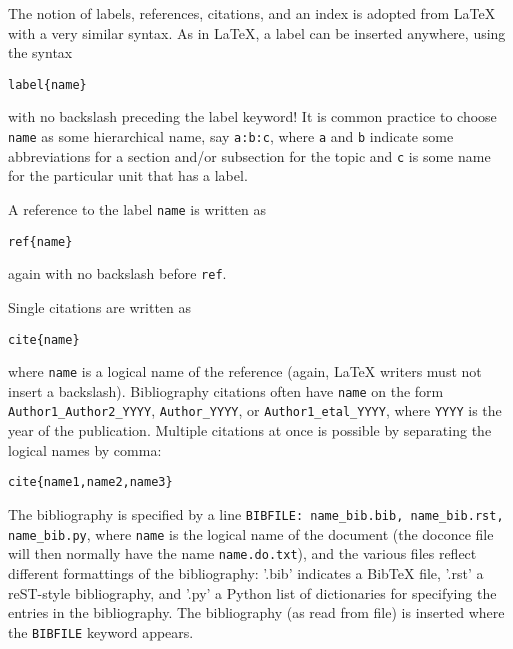 \documentclass[%
oneside,                 %
final,                   %
10pt]{article}
\begin{document}
The notion of labels, references, citations, and an index is adopted
from {\LaTeX} with a very similar syntax. As in {\LaTeX}, a label can be
inserted anywhere, using the syntax
\begin{Verbatim}[numbers=none,fontsize=\fontsize{9pt}{9pt},baselinestretch=0.85,xleftmargin=0mm]
label{name}
\end{Verbatim}
with no backslash
preceding the label keyword! It is common practice to choose \Verb!name!
as some hierarchical name, say \Verb!a:b:c!, where \Verb!a! and \Verb!b! indicate
some abbreviations for a section and/or subsection for the topic and
\Verb!c! is some name for the particular unit that has a label.

A reference to the label \Verb!name! is written as
\begin{Verbatim}[numbers=none,fontsize=\fontsize{9pt}{9pt},baselinestretch=0.85,xleftmargin=0mm]
ref{name}
\end{Verbatim}
again with no backslash before \Verb!ref!.

Single citations are written as
\begin{Verbatim}[numbers=none,fontsize=\fontsize{9pt}{9pt},baselinestretch=0.85,xleftmargin=0mm]
cite{name}
\end{Verbatim}
where \Verb!name! is a logical name
of the reference (again, {\LaTeX} writers must not insert a backslash).
Bibliography citations often have \Verb!name! on the form
\Verb!Author1_Author2_YYYY!, \Verb!Author_YYYY!, or \Verb!Author1_etal_YYYY!, where
\Verb!YYYY! is the year of the publication.
Multiple citations at once is possible by separating the logical names
by comma:
\begin{Verbatim}[numbers=none,fontsize=\fontsize{9pt}{9pt},baselinestretch=0.85,xleftmargin=0mm]
cite{name1,name2,name3}
\end{Verbatim}

The bibliography is specified by a line \Verb!BIBFILE: name_bib.bib, name_bib.rst, name_bib.py!, where \Verb!name! is the logical name of the
document (the doconce file will then normally have the name
\Verb!name.do.txt!), and the various files reflect different formattings of
the bibliography: '.bib' indicates a BibTeX file, '.rst' a reST-style
bibliography, and '.py' a Python list of dictionaries for specifying
the entries in the bibliography. The bibliography (as read from file)
is inserted where the \Verb!BIBFILE! keyword appears.
\end{document}
